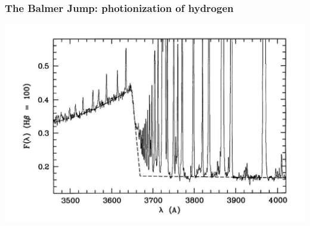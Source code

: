\begin{frame}\frametitle{The Balmer Jump: photionization of hydrogen}


\begin{center}
  \includegraphics[width=\textwidth,height=!]{./C/bj_liu.jpg}
\end{center}


\end{frame}
